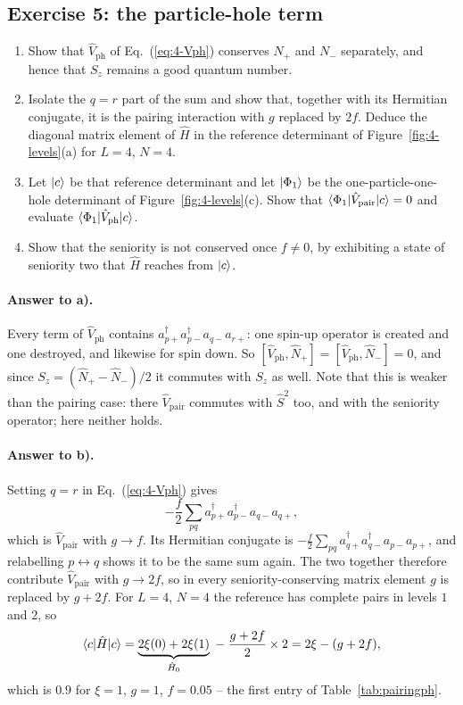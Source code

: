 \subsection*{Exercise 5: the particle-hole term}
\label{ex:4-pairingph}

\begin{enumerate}
  \item[a)] Show that $\hat{V}_{\mathrm{ph}}$ of Eq.~(\ref{eq:4-Vph})
  conserves $N_+$ and $N_-$ separately, and hence that $S_z$ remains a good
  quantum number.
  \item[b)] Isolate the $q=r$ part of the sum and show that, together with its
  Hermitian conjugate, it is the pairing interaction with $g$ replaced by
  $2f$.  Deduce the diagonal matrix element of $\hat{H}$ in the reference
  determinant of Figure~\ref{fig:4-levels}(a) for $L=4$, $N=4$.
  \item[c)] Let $\vert c \rangle$ be that reference determinant and let
  $\vert \Phi_1 \rangle$ be the one-particle-one-hole determinant of
  Figure~\ref{fig:4-levels}(c).  Show that
  $\langle \Phi_1 | \hat{V}_{\mathrm{pair}} | c \rangle=0$ and evaluate
  $\langle \Phi_1 | \hat{V}_{\mathrm{ph}} | c \rangle$.
  \item[d)] Show that the seniority is not conserved once $f\ne0$, by
  exhibiting a state of seniority two that $\hat{H}$ reaches from $\vert c \rangle$.
\end{enumerate}

\paragraph{Answer to a).}
Every term of $\hat{V}_{\mathrm{ph}}$ contains
$a^{\dagger}_{p+}a^{\dagger}_{p-}a_{q-}a_{r+}$: one spin-up operator is
created and one destroyed, and likewise for spin down.  So
$[\hat{V}_{\mathrm{ph}},\hat{N}_+]=[\hat{V}_{\mathrm{ph}},\hat{N}_-]=0$, and
since $S_z=(\hat{N}_+-\hat{N}_-)/2$ it commutes with $S_z$ as well.  Note that
this is weaker than the pairing case: there $\hat{V}_{\mathrm{pair}}$ commutes
with $\hat{S}^2$ too, and with the seniority operator; here neither holds.

\paragraph{Answer to b).}
Setting $q=r$ in Eq.~(\ref{eq:4-Vph}) gives
\[
  -\frac{f}{2}\sum_{pq} a^{\dagger}_{p+}a^{\dagger}_{p-}a_{q-}a_{q+} ,
\]
which is $\hat{V}_{\mathrm{pair}}$ with $g\to f$.  Its Hermitian conjugate is
$-\tfrac{f}{2}\sum_{pq}a^{\dagger}_{q+}a^{\dagger}_{q-}a_{p-}a_{p+}$, and
relabelling $p\leftrightarrow q$ shows it to be the same sum again.  The two
together therefore contribute $\hat{V}_{\mathrm{pair}}$ with $g\to2f$, so in
every seniority-conserving matrix element $g$ is replaced by $g+2f$.  For
$L=4$, $N=4$ the reference has complete pairs in levels $1$ and $2$, so
\[
  \langle c | \hat{H} | c \rangle
   = \underbrace{2\xi(0)+2\xi(1)}_{\hat{H}_0}
     \;-\;\frac{g+2f}{2}\times 2
   = 2\xi - (g+2f),
\]
which is $0.9$ for $\xi=1$, $g=1$, $f=0.05$ -- the first entry of
Table~\ref{tab:pairingph}.

